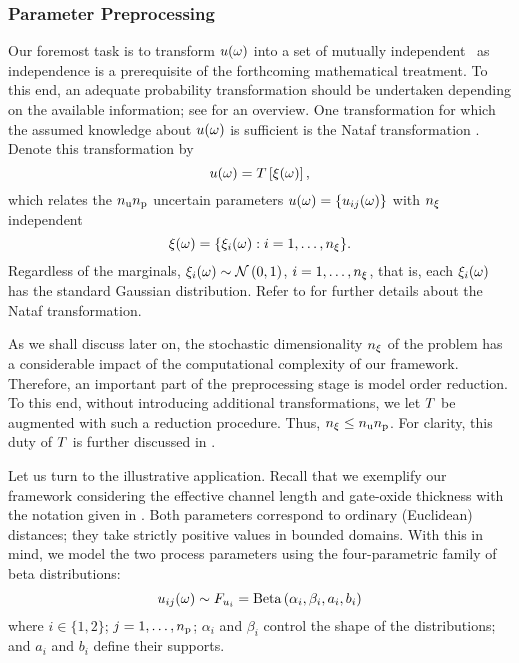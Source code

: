 \subsubsection{Parameter Preprocessing} 
Our foremost task is to transform $u(\omega)$ into a set of mutually independent \rvs\ as independence is a prerequisite of the forthcoming mathematical treatment.
To this end, an adequate probability transformation should be undertaken depending on the available information; see \cite{eldred2008} for an overview.
One transformation for which the assumed knowledge about $u(\omega)$ is sufficient is the Nataf transformation \cite{li2008}.
Denote this transformation by
\begin{equation} \elab{probability-transformation}
  \u(\o) = \transformation{\z(\o)},
\end{equation}
which relates the ${n_\text{u}} {n_\text{p}}$ uncertain parameters $u(\omega) = \{ u_{ij}(\omega) \}$ with ${n_\xi}$ independent \rvs
\begin{equation} \elab{independent-random-variables}
  \z(\o) = \{ \z_i(\o): i = 1, \dots, \nvars \}.
\end{equation}
Regardless of the marginals, $\xi_i(\omega) \sim \mathcal{N}\left( 0, 1 \right)$, $i = 1, \dots, {n_\xi}$, that is, each $\xi_i(\omega)$ has the standard Gaussian distribution.
Refer to  for further details about the Nataf transformation.

As we shall discuss later on, the stochastic dimensionality ${n_\xi}$ of the problem has a considerable impact of the computational complexity of our framework.
Therefore, an important part of the preprocessing stage is model order reduction.
To this end, without introducing additional transformations, we let $\transformation$ be augmented with such a reduction procedure.
Thus, ${n_\xi} \leq {n_\text{u}} {n_\text{p}}$.
For clarity, this duty of $\transformation$ is further discussed in .

Let us turn to the illustrative application.
Recall that we exemplify our framework considering the effective channel length and gate-oxide thickness with the notation given in .
Both parameters correspond to ordinary (Euclidean) distances; they take strictly positive values in bounded domains.
With this in mind, we model the two process parameters using the four-parametric family of beta distributions:
\begin{equation*}
  u_{ij}(\omega) \sim F_{u_i} = \text{Beta}\left( \alpha_i, \beta_i, a_i, b_i \right)
\end{equation*}
where $i \in \{ 1, 2 \}$; $j = 1, \dots, {n_\text{p}}$; $\alpha_i$ and $\beta_i$ control the shape of the distributions; and $a_i$ and $b_i$ define their supports.

